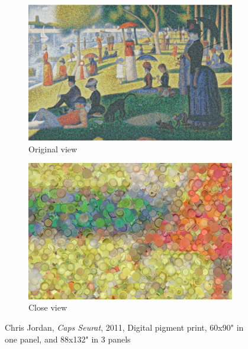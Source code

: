 \begin{figure}[h!]
\begin{subfigure}{.48\textwidth}
  \centering
  \includegraphics[width=\linewidth]{graphics/ChrisJordan_Numbers_OriginalView.jpg}
  \caption{Original view}
  \label{fig:ChrisJordan_Numbers_OriginalView}
\end{subfigure}
\hfill
\begin{subfigure}{.48\textwidth}
  \centering
  \includegraphics[width=\linewidth]{graphics/ChrisJordan_Numbers_CloseView.jpg}
  \caption{Close view}
  \label{fig:ChrisJordan_Numbers_CloseView}
\end{subfigure}
\caption{Chris Jordan, \textit{Caps Seurat}, 2011, Digital pigment print, 60x90" in one panel, and 88x132" in 3 panels}
\label{fig:ChrisJordan_Numbers_CapsSeurat}
\end{figure}

